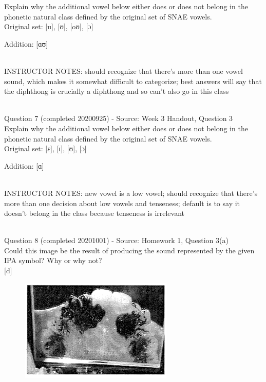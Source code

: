 \documentclass[12pt]{article}
\begin{document}
Explain why the additional vowel below either does or does not belong in the phonetic natural class defined by the original set of SNAE vowels.\\

Original set: {[u]}, {[ʊ]}, {[oʊ]}, {[ɔ]}

Addition: {[ɑʊ]}


~\\
INSTRUCTOR NOTES: should recognize that there's more than one vowel sound, which makes it somewhat difficult to categorize; best answers will say that the diphthong is crucially a diphthong and so can't also go in this class


~\\

{\large Question 7} (completed 20200925) - Source: Week 3 Handout, Question 3\\

Explain why the additional vowel below either does or does not belong in the phonetic natural class defined by the original set of SNAE vowels.\\

Original set: {[ɛ]}, {[ɪ]}, {[ʊ]}, {[ɔ]}

Addition: {[ɑ]}


~\\
INSTRUCTOR NOTES: new vowel is a low vowel; should recognize that there's more than one decision about low vowels and tenseness; default is to say it doesn't belong in the class because tenseness is irrelevant


~\\

{\large Question 8} (completed 20201001) - Source: Homework 1, Question 3(a)\\

Could this image be the result of producing the sound represented by the given IPA symbol? Why or why not?\\

{[d]}

\begin{figure}[H]
\includegraphics{../images/staticpalatography_fricative.png}
\end{figure}
\end{document}
